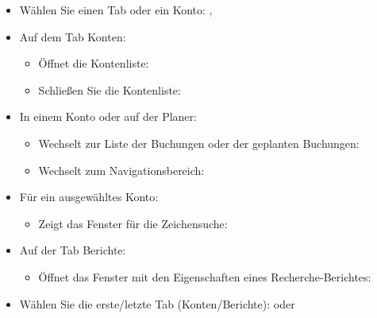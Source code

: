 \begin{itemize}
	\item Wählen Sie einen Tab oder ein Konto: \keys{\arrowkeyup}, \keys{\arrowkeydown}
	\item Auf dem Tab Konten:
	\begin{itemize}
		\item Öffnet die Kontenliste: \keys{\arrowkeyright}
		\item Schließen Sie die Kontenliste: \keys{\arrowkeyleft}
	\end{itemize}
	\item In einem Konto oder auf der Planer:
	\begin{itemize}
		\item Wechselt zur Liste der Buchungen oder der geplanten Buchungen: \keys{\arrowkeyright}
		\item Wechselt zum Navigationsbereich: \keys{\arrowkeyleft}
	\end{itemize}
	\item Für ein ausgewähltes Konto:
	\begin{itemize}
		\item Zeigt das Fenster für die Zeichensuche: 
	\end{itemize}
	\item Auf der Tab Berichte:
	\begin{itemize}
		\item Öffnet das Fenster mit den Eigenschaften eines Recherche-Berichtes: 
	\end{itemize}	
	\item Wählen Sie die erste/letzte Tab (Konten/Berichte):  oder 
\end{itemize}


